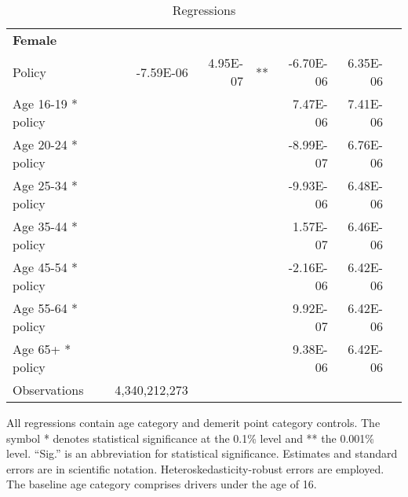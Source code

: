 \begin{table}
\begin{tabular}{l r r l r r l}
\hline 

\textbf{Female} \\ 

Policy             &  -7.59E-06        &  4.95E-07       &   **       &  -6.70E-06        &  6.35E-06       &            \\ 
Age 16-19 * policy           & & &  &  7.47E-06        &  7.41E-06       &            \\ 
Age 20-24 * policy           & & &  &  -8.99E-07        &  6.76E-06       &            \\ 
Age 25-34 * policy           & & &  &  -9.93E-06        &  6.48E-06       &            \\ 
Age 35-44 * policy           & & &  &  1.57E-07        &  6.46E-06       &            \\ 
Age 45-54 * policy           & & &  &  -2.16E-06        &  6.42E-06       &            \\ 
Age 55-64 * policy           & & &  &  9.92E-07        &  6.42E-06       &            \\ 
Age 65+ * policy           & & &  &  9.38E-06        &  6.42E-06       &            \\ 
Observations & 4,340,212,273 \\ 


\hline 

\end{tabular} 
\caption{Regressions} 
All regressions contain age category and demerit point category controls. 
The symbol * denotes statistical significance at the 0.1\% level 
and ** the 0.001\% level. 
``Sig.'' is an abbreviation for statistical significance. 
Estimates and standard errors are in scientific notation. 
Heteroskedasticity-robust errors are employed. 
The baseline age category comprises drivers under the age of 16. 
\label{tab:orig_regs} 
\end{table} 
 
